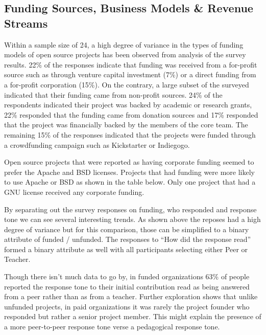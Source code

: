 \subsection{Funding Sources, Business Models \& Revenue Streams}

Within a sample size of 24, a high degree of variance in the types of funding models of open source projects has been observed from analysis of the survey results. 22\% of the responses indicate that funding was received from a for-profit source such as through venture capital investment (7\%) or a direct funding from a for-profit corporation (15\%). On the contrary, a large subset of the surveyed indicated that their funding came from non-profit sources. 24\% of the respondents indicated their project was backed by academic or research grants, 22\% responded that the funding came from donation sources and 17\% responded that the project was financially backed by the members of the core team. The remaining 15\% of the responses indicated that the projects were funded through a crowdfunding campaign such as Kickstarter or Indiegogo.


Open source projects that were reported as having corporate funding seemed to prefer the Apache and BSD licenses. Projects that had funding were more likely to use Apache or BSD as shown in the table below. Only one project that had a GNU license received any corporate funding. 



By separating out the survey responses on funding, who responded and response tone we can see several interesting trends. As shown above the reposes had a high degree of variance but for this comparison, those can be simplified to a binary attribute of funded / unfunded. The responses to “How did the response read” formed a binary attribute as well with all participants selecting either Peer or Teacher.

Though there isn't much data to go by, in funded organizations 63\% of people reported the response tone to their initial contribution read as being answered from a peer rather than as from a teacher. Further exploration shows that unlike unfunded projects, in paid organizations it was rarely the project founder who responded but rather a senior project member. This might explain the presence of a more peer-to-peer response tone verse a pedagogical response tone.

